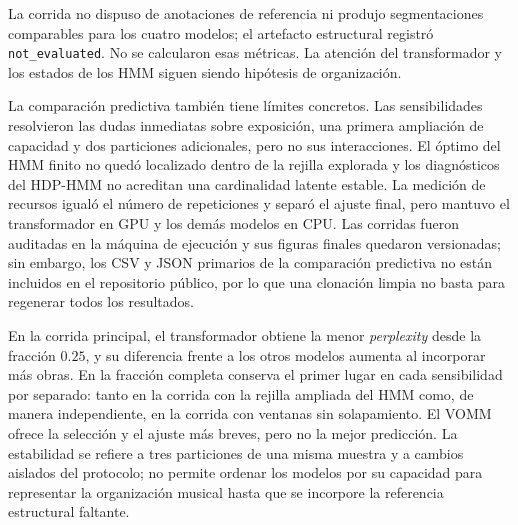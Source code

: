 La corrida no dispuso de anotaciones de referencia ni produjo segmentaciones comparables para los cuatro modelos; el artefacto estructural registró \texttt{not\_evaluated}. No se calcularon esas métricas. La atención del transformador y los estados de los HMM siguen siendo hipótesis de organización.

La comparación predictiva también tiene límites concretos. Las sensibilidades resolvieron las dudas inmediatas sobre exposición, una primera ampliación de capacidad y dos particiones adicionales, pero no sus interacciones. El óptimo del HMM finito no quedó localizado dentro de la rejilla explorada y los diagnósticos del HDP-HMM no acreditan una cardinalidad latente estable. La medición de recursos igualó el número de repeticiones y separó el ajuste final, pero mantuvo el transformador en GPU y los demás modelos en CPU. Las corridas fueron auditadas en la máquina de ejecución y sus figuras finales quedaron versionadas; sin embargo, los CSV y JSON primarios de la comparación predictiva no están incluidos en el repositorio público, por lo que una clonación limpia no basta para regenerar todos los resultados.

En la corrida principal, el transformador obtiene la menor \emph{perplexity} desde la fracción $0.25$, y su diferencia frente a los otros modelos aumenta al incorporar más obras. En la fracción completa conserva el primer lugar en cada sensibilidad por separado: tanto en la corrida con la rejilla ampliada del HMM como, de manera independiente, en la corrida con ventanas sin solapamiento. El VOMM ofrece la selección y el ajuste más breves, pero no la mejor predicción. La estabilidad se refiere a tres particiones de una misma muestra y a cambios aislados del protocolo; no permite ordenar los modelos por su capacidad para representar la organización musical hasta que se incorpore la referencia estructural faltante.
